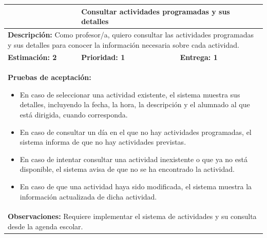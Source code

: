 \vspace{0.4cm}

\begin{table}[H]
\centering
{}
\begin{tabularx}{\textwidth}{|X|X|X|}
\hline
\rowcolor{azulclaro}
\multicolumn{1}{|l|}{\textbf{Identificador:} HU-P2} & \multicolumn{2}{l|}{\textbf{Consultar actividades programadas y sus detalles}} \\ \hline
\multicolumn{3}{|p{\dimexpr\textwidth-2\tabcolsep-2\arrayrulewidth}|}{\textbf{Descripción:} Como profesor/a, quiero consultar las actividades programadas y sus detalles para conocer la información necesaria sobre cada actividad.} \\ \hline
\rowcolor{white}
\textbf{Estimación: 2} & \textbf{Prioridad: 1} & \textbf{Entrega: 1} \\ \hline
\multicolumn{3}{|p{\dimexpr\textwidth-2\tabcolsep-2\arrayrulewidth}|}{%
\textbf{Pruebas de aceptación:}
\begin{itemize}[leftmargin=1.5em, itemsep=2pt, topsep=3pt]
    \item En caso de seleccionar una actividad existente, el sistema muestra sus detalles, incluyendo la fecha, la hora, la descripción y el alumnado al que está dirigida, cuando corresponda.
    \item En caso de consultar un día en el que no hay actividades programadas, el sistema informa de que no hay actividades previstas.
    \item En caso de intentar consultar una actividad inexistente o que ya no está disponible, el sistema avisa de que no se ha encontrado la actividad.
    \item En caso de que una actividad haya sido modificada, el sistema muestra la información actualizada de dicha actividad.
\end{itemize}
} \\ \hline
\multicolumn{3}{|p{\dimexpr\textwidth-2\tabcolsep-2\arrayrulewidth}|}{\textbf{Observaciones:} Requiere implementar el sistema de actividades y su consulta desde la agenda escolar.} \\ \hline
\end{tabularx}
\end{table}

\vspace{0.4cm}

